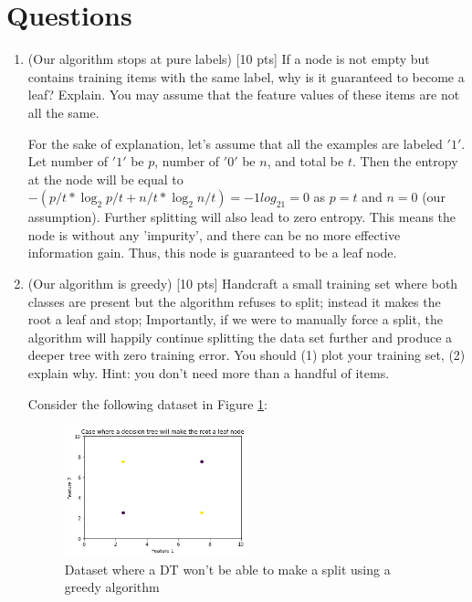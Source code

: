 \documentclass[a4paper]{article}
\theoremstyle{definition}
\newenvironment{soln}{
    \leavevmode\color{blue}\ignorespaces
}{}
\begin{document}
\section{Questions}
\begin{enumerate}
\item (Our algorithm stops at pure labels) [10 pts] If a node is not empty but contains training items with the same label, why is it guaranteed to become a leaf?  Explain. You may assume that the feature values of these items are not all the same. \\
\begin{soln}
    For the sake of explanation, let's assume that all the examples are labeled $'1'$. Let number of $'1'$ be $p$, number of $'0'$ be $n$, and total be $t$.
    Then the entropy at the node will be equal to $-(p/t*\log_{2}p/t + n/t*\log_{2}n/t)=-1log_21=0$ as $p=t$ and $n=0$ (our assumption). Further splitting will also lead to zero entropy. This means the node is without any 'impurity', and there can be no more effective information gain. Thus, this node is guaranteed to be a leaf node. 
\end{soln}

\item (Our algorithm is greedy)  [10 pts] Handcraft a small training set where both classes are present but the algorithm refuses to split; instead it makes the root a leaf and stop;
Importantly, if we were to manually force a split, the algorithm will happily continue splitting the data set further and produce a deeper tree with zero training error.
You should (1) plot your training set, (2) explain why.  Hint: you don't need more than a handful of items. \\
\begin{soln}
 Consider the following dataset in Figure \ref{fig:q2rootlead}:
    \begin{figure}[h!]
        \centering
        \includegraphics[width=0.5\textwidth]{images/q2_2_root_is_leaf.png}
        \caption{Dataset where a DT won't be able to make a split using a greedy algorithm}
        \label{fig:q2rootlead}
    \end{figure}


\end{soln}
\end{enumerate}
\end{document}
